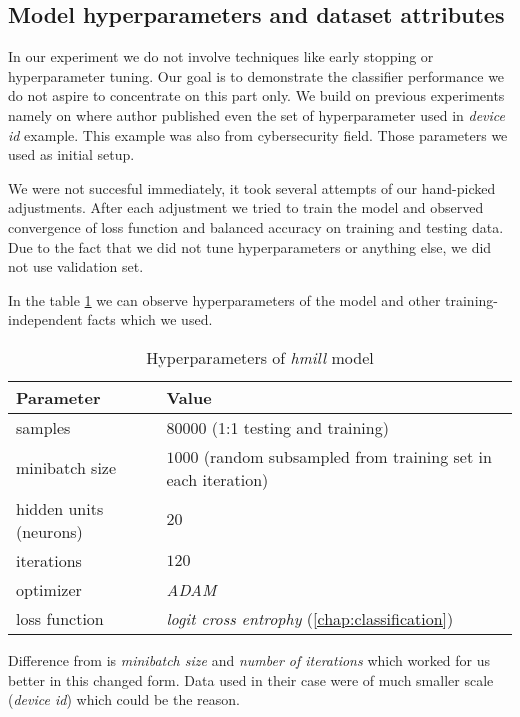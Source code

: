 \subsection{Model hyperparameters and dataset attributes}
In our experiment we do not involve techniques like early stopping or hyperparameter tuning. Our goal is to demonstrate the classifier performance we do not aspire to concentrate on this part only. We build on previous experiments namely on \cite{Mandlik2020} where author published even the set of hyperparameter used in \emph{device id} example. This example was also from cybersecurity field. Those parameters we used as initial setup.

We were not succesful immediately, it took several attempts of our hand-picked adjustments. After each adjustment we tried to train the model and observed convergence of loss function and balanced accuracy on training and testing data. Due to the fact that we did not tune hyperparameters or anything else, we did not use validation set. 

In the table \ref{tab:hyperparams} we can observe hyperparameters of the model and other training-independent facts which we used.


\begin{table}[h]
  \centering
  \caption{Hyperparameters of \emph{hmill} model}
  \begin{tabular}{p{6cm}p{8cm}} 
      \toprule
      \textbf{Parameter} &
      \textbf{Value} \\
      \midrule
      samples & $80000$ (1:1 testing and training) \\
      \midrule
      minibatch size & $1000$ (random subsampled from training set in each iteration)\\
      \midrule
      hidden units (neurons)& $20$\\
      \midrule
      iterations & $120$\\
      \midrule
      optimizer & \emph{ADAM} \cite{Kingma2014}\\
      \midrule
      loss function & \emph{logit cross entrophy} (\ref{chap:classification})\\
      \bottomrule
  \end{tabular}
  \label{tab:hyperparams}
\end{table}


Difference from \cite{Mandlik2020} is \emph{minibatch size} and \emph{number of iterations} which worked for us better in this changed form. Data used in their case were of much smaller scale (\emph{device id}) which could be the reason.

